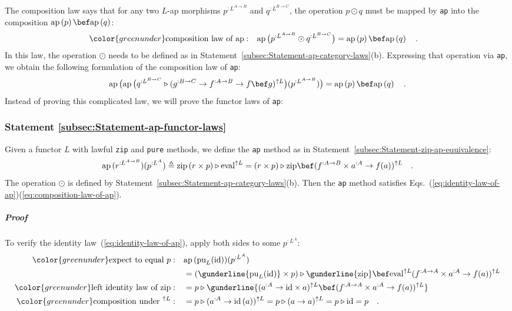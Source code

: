 The composition law says that for any two $L$-ap morphisms $p^{:L^{A\rightarrow B}}$
and $q^{:L^{B\rightarrow C}}$, the operation $p\odot q$ must be
mapped by \lstinline!ap! into the composition $\text{ap}\left(p\right)\bef\text{ap}\left(q\right)$:
\begin{align}
{\color{greenunder}\text{composition law of }\text{ap}:}\quad & \text{ap}\,\big(p^{:L^{A\rightarrow B}}\odot q^{:L^{B\rightarrow C}}\big)=\text{ap}\left(p\right)\bef\text{ap}\left(q\right)\quad.\label{eq:composition-law-of-ap}
\end{align}
In this law, the operation $\odot$ needs to be defined as in Statement~\ref{subsec:Statement-ap-category-laws}(b).
Expressing that operation via \lstinline!ap!, we obtain the following
formulation of the composition law of
\lstinline!ap!:
\[
\text{ap}\,\big(\text{ap}\,\big(q^{:L^{B\rightarrow C}}\triangleright(g^{:B\rightarrow C}\rightarrow f^{:A\rightarrow B}\rightarrow f\bef g)^{\uparrow L}\big)(p^{:L^{A\rightarrow B}})\big)=\text{ap}\left(p\right)\bef\text{ap}\left(q\right)\quad.
\]
Instead of proving this complicated law, we will prove the functor
laws of \lstinline!ap!:

\subsubsection{Statement \label{subsec:Statement-ap-functor-laws}\ref{subsec:Statement-ap-functor-laws}}

Given a functor $L$ with lawful \lstinline!zip! and \lstinline!pure!
methods, we define the \lstinline!ap! method as in Statement~\ref{subsec:Statement-zip-ap-equivalence}:
\[
\text{ap}\,(r^{:L^{A\rightarrow B}})(p^{:L^{A}})\triangleq\text{zip}\,(r\times p)\triangleright\text{eval}^{\uparrow L}=(r\times p)\triangleright\text{zip}\bef(f^{:A\rightarrow B}\times a^{:A}\rightarrow f(a))^{\uparrow L}\quad.
\]
The operation $\odot$ is defined by Statement~\ref{subsec:Statement-ap-category-laws}(b).
Then the \lstinline!ap! method satisfies Eqs.~(\ref{eq:identity-law-of-ap})\textendash (\ref{eq:composition-law-of-ap}). 

\subparagraph{Proof}

To verify the identity law~(\ref{eq:identity-law-of-ap}), apply
both sides to some $p^{:L^{A}}$:
\begin{align*}
{\color{greenunder}\text{expect to equal }p:}\quad & \text{ap}\,(\text{pu}_{L}(\text{id}))(p^{:L^{A}})\\
 & =(\gunderline{\text{pu}_{L}(\text{id})}\times p)\triangleright\gunderline{\text{zip}}\bef\text{eval}^{\uparrow L}(f^{:A\rightarrow A}\times a^{:A}\rightarrow f(a))^{\uparrow L}\\
{\color{greenunder}\text{left identity law of }\text{zip}:}\quad & =p\triangleright\gunderline{(a^{:A}\rightarrow\text{id}\times a)^{\uparrow L}\bef(f^{:A\rightarrow A}\times a^{:A}\rightarrow f(a))^{\uparrow L}}\\
{\color{greenunder}\text{composition under }^{\uparrow L}:}\quad & =p\triangleright(a^{:A}\rightarrow\text{id}\,(a))^{\uparrow L}=p\triangleright(a\rightarrow a)^{\uparrow L}=p\triangleright\text{id}=p\quad.
\end{align*}

